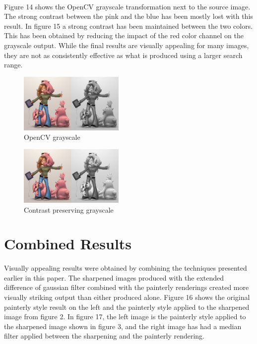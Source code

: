 \documentclass[10pt,twocolumn]{article}
\begin{document}
	\paragraph{} Figure 14 shows the OpenCV grayscale transformation next to the source image.  The strong contrast between the pink and the blue has been mostly lost with this result.  In figure 15 a strong contrast has been maintained between the two colors.  This has been obtained by reducing the impact of the red color channel on the grayscale output. While the final results are visually appealing for many images, they are not as consistently effective as what is produced using a larger search range.

\begin{figure}
\centering
\includegraphics[width=0.45\textwidth]{greyC.jpg}
\caption{OpenCV grayscale}
\end{figure}
\begin{figure}
\centering
\includegraphics[width=0.45\textwidth]{greyL.jpg}
\caption{Contrast preserving grayscale}
\end{figure}

\section{Combined Results}
	\paragraph{} Visually appealing results were obtained by combining the techniques presented earlier in this paper.   The sharpened images produced with the extended difference of gaussian filter combined with the painterly renderings created more visually striking output than either produced alone.  
Figure 16 shows the original painterly style result on the left and the painterly style applied to the sharpened image from figure 2.  In figure 17, the left image is the painterly style applied to the sharpened image shown in figure 3, and the right image has had a median filter applied between the sharpening and the painterly rendering.
\end{document}
